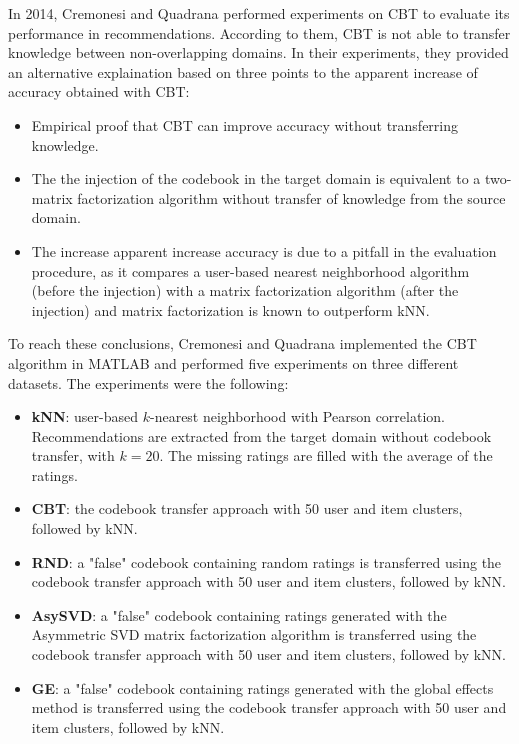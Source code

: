 In 2014, Cremonesi and Quadrana \cite{10.1145/2645710.2645769} performed experiments on CBT to evaluate its performance in recommendations. According to them, CBT is not able to transfer knowledge between non-overlapping domains. In their experiments, they provided an alternative explaination based on three points to the apparent increase of accuracy obtained with CBT:
\begin{itemize}
\item Empirical proof that CBT can improve accuracy without transferring knowledge.
\item The the injection of the codebook in the target domain is equivalent to a two-matrix factorization algorithm without transfer of knowledge from the source domain.
\item The increase apparent increase accuracy is due to a pitfall in the evaluation procedure, as it compares a user-based nearest neighborhood algorithm (before the injection) with a matrix factorization algorithm (after the injection) and matrix factorization is known to outperform kNN.
\end{itemize}
To reach these conclusions, Cremonesi and Quadrana implemented the CBT algorithm in MATLAB and performed five experiments on three different datasets. The experiments were the following:
\begin{itemize}
\item \textbf{kNN}: user-based $k$-nearest neighborhood with Pearson correlation. Recommendations are extracted from the target domain without codebook transfer, with $k = 20$. The missing ratings are filled with the average of the ratings.
\item \textbf{CBT}: the codebook transfer approach with 50 user and item clusters, followed by kNN.
\item \textbf{RND}: a "false" codebook containing random ratings is transferred using the codebook transfer approach with 50 user and item clusters, followed by kNN.
\item \textbf{AsySVD}: a "false" codebook containing ratings generated with the Asymmetric SVD matrix factorization algorithm \cite{10.1145/1401890.1401944} is transferred using the codebook transfer approach with 50 user and item clusters, followed by kNN.
\item \textbf{GE}: a "false" codebook containing ratings generated with the global effects method \cite{10.1145/1401890.1401944} is transferred using the codebook transfer approach with 50 user and item clusters, followed by kNN.
\end{itemize}


